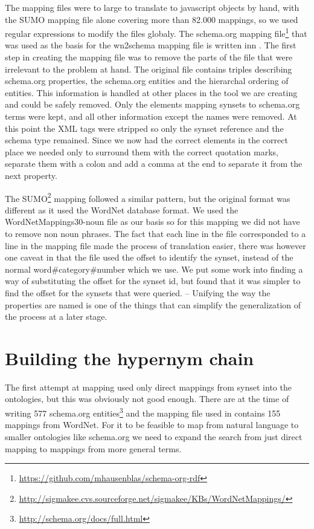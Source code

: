 The mapping files were to large to translate to javascript objects by hand, with the SUMO mapping file alone
covering more than 82.000 mappings, so we used regular expressions to modify the files globaly.
The schema.org mapping file\footnote{\url{https://github.com/mhausenblas/schema-org-rdf}}
that was used as the basis for the wn2schema mapping file is written inn .
The first step in creating the mapping file was to remove the parts of the file that were irrelevant to the problem at hand.
The original file contains triples describing schema.org properties,
the schema.org entities and the hierarchal ordering of entities.
This information is handled at other places in the tool we are creating and could be safely removed.
Only the elements mapping synsets to schema.org terms were kept, and all other information except the names were removed.
At this point the XML tags were stripped so only the synset reference and the schema type remained.
Since we now had the correct elements in the correct place we needed only to surround them with the correct quotation
marks, separate them with a colon and add a comma at the end to separate it from the next property.

The SUMO\footnote{\url{http://sigmakee.cvs.sourceforge.net/sigmakee/KBs/WordNetMappings/}} mapping followed a similar pattern,
but the original format was different as it used the WordNet database format.
We used the WordNetMappings30-noun file as our basis so for this mapping we did not have to remove non noun phrases.
The fact that each line in the file corresponded to a line in the mapping file made the process of translation easier,
there was however one caveat in that the file used the offset to identify the synset,
instead of the normal word\#category\#number which we use.
We put some work into finding a way of substituting the offset for the synset id,
but found that it was simpler to find the offset for the synsets that were queried.
-- Unifying the way the properties are named is one of the things that can simplify the generalization of the process at a later stage.



\section{Building the hypernym chain}
The first attempt at mapping used only direct mappings from synset into the ontologies,
but this was obviously not good enough.
There are at the time of writing 577 schema.org entities\footnote{\url{http://schema.org/docs/full.html}}
and the mapping file used in \theartefact contains 155 mappings from WordNet.
For it to be feasible to map from natural language to smaller ontologies like schema.org we need to expand the search
from just direct mapping to mappings from more general terms.

